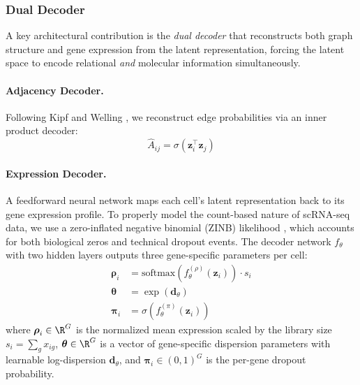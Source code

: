 \documentclass{article}
\newcommand{\sigmoid}{\sigma}
\begin{document}
\subsubsection{Dual Decoder}
\label{sec:dual_decoder}

A key architectural contribution is the \textit{dual decoder} that reconstructs both graph structure and gene expression from the latent representation, forcing the latent space to encode relational \textit{and} molecular information simultaneously.

\paragraph{Adjacency Decoder.} Following Kipf and Welling \cite{kipf2016variational}, we reconstruct edge probabilities via an inner product decoder:
\begin{equation}
    \hat{A}_{ij} = \sigmoid(\mathbf{z}_i^\top \mathbf{z}_j)
    \label{eq:adj_decoder}
\end{equation}

\paragraph{Expression Decoder.} A feedforward neural network maps each cell's latent representation back to its gene expression profile. To properly model the count-based nature of scRNA-seq data, we use a zero-inflated negative binomial (ZINB) likelihood \cite{lopez2018deep}, which accounts for both biological zeros and technical dropout events. The decoder network $f_\theta$ with two hidden layers outputs three gene-specific parameters per cell:
\begin{align}
    \boldsymbol{\rho}_i &= \text{softmax}\!\left(f_\theta^{(\rho)}(\mathbf{z}_i)\right) \cdot s_i  \label{eq:zinb_mu} \\
    \boldsymbol{\theta} &= \exp\!\left(\mathbf{d}_\theta\right) \label{eq:zinb_theta} \\
    \boldsymbol{\pi}_i &= \sigmoid\!\left(f_\theta^{(\pi)}(\mathbf{z}_i)\right) \label{eq:zinb_pi}
\end{align}
where $\boldsymbol{\rho}_i \in \R^G$ is the normalized mean expression scaled by the library size $s_i = \sum_g x_{ig}$, $\boldsymbol{\theta} \in \R^G$ is a vector of gene-specific dispersion parameters with learnable log-dispersion $\mathbf{d}_\theta$, and $\boldsymbol{\pi}_i \in (0,1)^G$ is the per-gene dropout probability.
\end{document}
